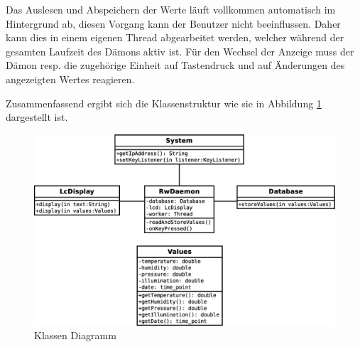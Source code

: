 \documentclass[
    10pt,
    a4paper,
]{scrartcl}
\begin{document}
Das Auslesen und Abspeichern der Werte läuft vollkommen automatisch im Hintergrund ab,
diesen Vorgang kann der Benutzer nicht beeinflussen. Daher kann dies in einem eigenen
Thread abgearbeitet werden, welcher während der gesamten Laufzeit des Dämons aktiv ist.
Für den Wechsel der Anzeige muss der Dämon resp. die zugehörige Einheit auf Tastendruck
und auf Änderungen des angezeigten Wertes reagieren.

Zusammenfassend ergibt sich die Klassenstruktur wie sie in Abbildung
\ref{fig:class-diagram} dargestellt ist.

\begin{figure}[ht]
    \centering
    \includegraphics[width=\textwidth]{class-diagram.eps}
    \caption{Klassen Diagramm}
    \label{fig:class-diagram}
\end{figure}


\listoffigures




\end{document}
